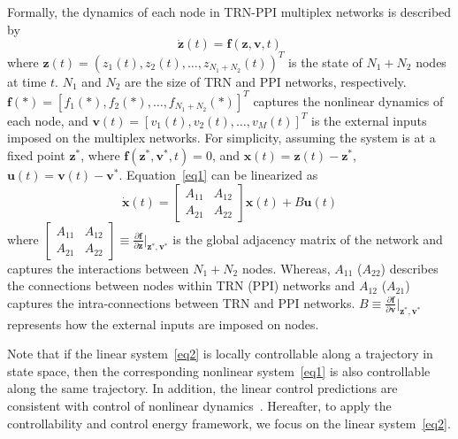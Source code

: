\documentclass[%
 reprint,
 amsmath,amssymb,
 aps,
]{revtex4-2}
\begin{document}
Formally, the dynamics of each node in TRN-PPI multiplex networks is described by
\begin{equation} 
\label{eq1}
\dot{\boldsymbol{z}}(t)=\boldsymbol{f}(\boldsymbol{z},\boldsymbol{v},t)
\end{equation}
where $\boldsymbol{z}(t)=(z_{1}(t),z_{2}(t),\dotsc,z_{N_{1}+N_{2}}(t))^T$ is the state of $N_{1}+N_{2}$ nodes at time $t$. $N_{1}$ and $N_{2}$ are the size of TRN and PPI networks, respectively. $\boldsymbol{f}(*)=[f_{1}(*),f_{2}(*),\dotsc,f_{ N_{1}+N_{2}}(*)]^T$  captures the nonlinear dynamics of each node, and $\boldsymbol{v}(t)=[v_{1}(t),v_{2}(t),\dotsc,v_{M}(t)]^T$ is the external inputs imposed on the multiplex networks. For simplicity, assuming the system is at a fixed point $\boldsymbol{z}^*$, where $\boldsymbol{f}(\boldsymbol{z}^*, \boldsymbol{v}^*,t)=0$, and $\boldsymbol{x}(t)=\boldsymbol{z}(t)-\boldsymbol{z}^*$,  $\boldsymbol{u}(t)=\boldsymbol{v}(t)-\boldsymbol{v}^*$. Equation~\ref{eq1} can be linearized as
\begin{equation} 
\label{eq2}
    \dot{\mathbf{x}}(t)={
\left[ \begin{array}{cc}
A_{11} & A_{12} \\
A_{21} & A_{22} 
\end{array} 
\right ]} \mathbf{x}(t)+B\mathbf{u}(t)
\end{equation}
where $\left[\begin{array}{cc}A_{11} & A_{12} \\A_{21} & A_{22} \end{array} \right ]\equiv{{\frac{\partial \boldsymbol{f}}{\partial \boldsymbol{z}}}\bigg|_{\boldsymbol{z}^*,\boldsymbol{v}^*}}$ is the global adjacency matrix of the network and captures the interactions between $N_1+ N_{2}$ nodes. Whereas, $A_{11}$ ($A_{22}$) describes the connections between nodes within TRN (PPI) networks and $A_{12}$ ($A_{21}$) captures the intra-connections between TRN and PPI networks. $B\equiv{{\frac{\partial \boldsymbol{f}}{\partial \boldsymbol{v}}}\bigg|_{\boldsymbol{z}^*,\boldsymbol{v}^*}}$ represents how the external inputs are imposed on nodes. 

Note that if the linear system~\ref{eq2} is locally controllable along a trajectory in state space, then the corresponding nonlinear system~\ref{eq1} is also controllable along the same trajectory. In addition, the linear control predictions are consistent with control of nonlinear dynamics~\cite{yan2017network}. Hereafter, to apply the controllability and control energy framework, we focus on the linear system~\ref{eq2}. 
\end{document}
